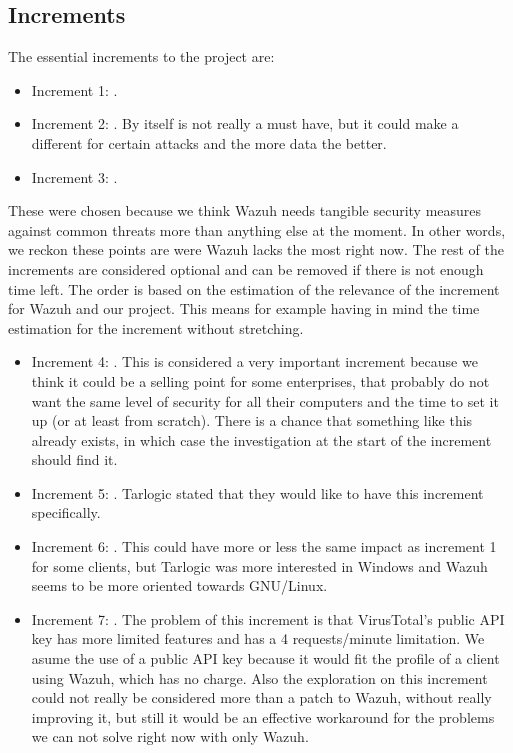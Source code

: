\subsection{Increments}
The essential increments to the project are:
\begin{itemize}
	\item Increment 1: \IncrementoUno.
	\item Increment 2: \IncrementoDos. By itself is not really a must have, but it could make a different for certain attacks and the more data the better.
	\item Increment 3: \IncrementoTres.
\end{itemize}
\linej
These were chosen because we think Wazuh needs tangible security measures against common threats more than anything else at the moment. In other words, we reckon these points are were Wazuh lacks the most right now.
\linej
\linej
The rest of the increments are considered optional and can be removed if there is not enough time left. The order is based on the estimation of the relevance of the increment for Wazuh and our project. This means for example having in mind the time estimation for the increment without stretching.
\begin{itemize}
	\item Increment 4: \IncrementoCuatro. This is considered a very important increment because we think it could be a selling point for some enterprises, that probably do not want the same level of security for all their computers and the time to set it up (or at least from scratch). There is a chance that something like this already exists, in which case the investigation at the start of the increment should find it.
	\item Increment 5: \IncrementoCinco. Tarlogic stated that they would like to have this increment specifically.
	\item Increment 6: \IncrementoSeis. This could have more or less the same impact as increment 1 for some clients, but Tarlogic was more interested in Windows and Wazuh seems to be more oriented towards GNU/Linux.
	\item Increment 7: \IncrementoSiete. The problem of this increment is that VirusTotal's public API key has more limited features and has a 4 requests/minute limitation\cite{virustotal_faq}. We asume the use of a public API key because it would fit the profile of a client using Wazuh, which has no charge. Also the exploration on this increment could not really be considered more than a patch to Wazuh, without really improving it, but still it would be an effective workaround for the problems we can not solve right now with only Wazuh.
\end{itemize}


